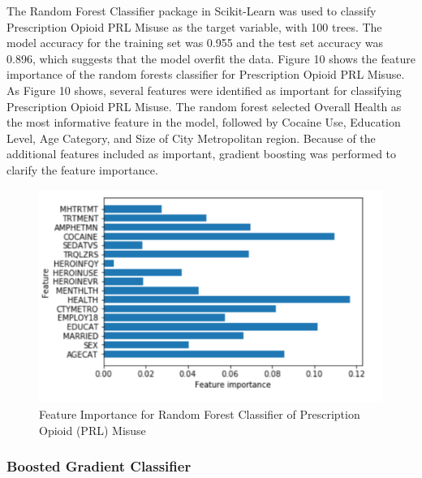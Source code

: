 \documentclass[sigconf]{acmart}
\begin{document}
The Random Forest Classifier package in Scikit-Learn was used to classify
Prescription Opioid PRL Misuse as the target variable, with 100 trees. The 
model accuracy for the training set was 0.955 and the test set accuracy was 
0.896, which suggests that the model overfit the data. Figure 10 shows the 
feature importance of the random forests classifier for Prescription Opioid 
PRL Misuse. As Figure 10 shows, several features were identified as important
for classifying Prescription Opioid PRL Misuse. The random forest selected 
Overall Health as the most informative feature in the model, followed by 
Cocaine Use, Education Level, Age Category, and Size of City Metropolitan 
region. Because of the additional features included as important, gradient boosting was performed to clarify the feature importance.

\begin{figure}[!ht]
  \centering\includegraphics[width=\columnwidth]{images/Figure10.pdf}
  \caption{Feature Importance for Random Forest Classifier of 
  Prescription Opioid (PRL) Misuse}
  \label{f:Figure10}
\end{figure}

\subsubsection{Boosted Gradient Classifier}
\end{document}
